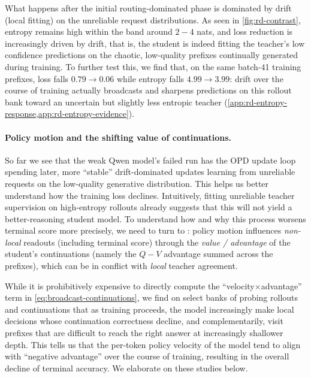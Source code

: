 What happens after the initial routing-dominated phase is dominated by drift (local fitting) on the unreliable request distributions. 
As seen in \cref{fig:rd-contrast}, entropy remains high within the band around $2-4$ nats, and loss reduction is increasingly driven by drift, that is, the student is indeed fitting the teacher's low confidence predictions on the chaotic, low-quality prefixes continually generated during training. To further test this, we find that, on the same batch-41 training prefixes, loss falls $0.79\to0.06$ while entropy falls $4.99\to3.99$: drift over the course of training actually broadcasts and sharpens predictions on this rollout bank toward an uncertain but slightly less entropic teacher (\cref{app:rd-entropy-response,app:rd-entropy-evidence}).

\paragraph{Policy motion and the shifting value of continuations.} So far we see that the weak Qwen model's failed run has the OPD update loop spending later, more ``stable'' drift-dominated updates learning from unreliable requests on the low-quality generative distribution. This helps us better understand how the training loss declines. Intuitively, fitting unreliable teacher supervision on high-entropy rollouts already suggests that this will not yield a better-reasoning student model. To understand how and why this process worsens terminal score more precisely, we need to turn to : policy motion influences \emph{non-local} readouts (including terminal score) through the \emph{value / advantage} of the student's continuations (namely the $Q - V$ advantage summed across the prefixes), which can be in conflict with \emph{local} teacher agreement. 

While it is prohibitively expensive to directly compute the ``velocity$\times$advantage'' term in \cref{eq:broadcast-continuations}, we find on select banks of probing rollouts and continuations that as training proceeds, the model increasingly make local decisions whose continuation correctness decline, and complementarily, visit prefixes that are difficult to reach the right answer at increasingly shallower depth. This tells us that the per-token policy velocity of the model tend to align with ``negative advantage'' over the course of training, resulting in the overall decline of terminal accuracy. We elaborate on these studies below.

